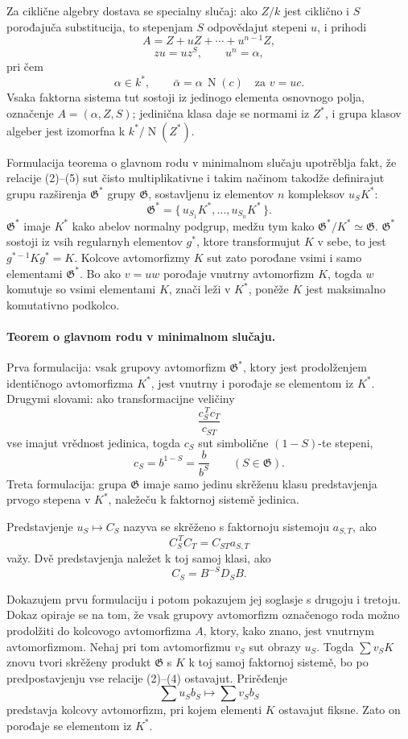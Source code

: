 \documentclass[11pt]{article}
\providecommand{\Norm}{\operatorname{N}}
\providecommand{\Gg}{\mathfrak G}
\begin{document}
Za ciklične algebry dostava se specialny slučaj: ako \(Z/k\) jest ciklično i \(S\) porođajuča substitucija, to stepenjam \(S\) odpovědajut stepeni \(u\), i prihodi
\[
        A=Z+uZ+\cdots+u^{n-1}Z,                              \tag{1'}
\]
\[
        zu=uz^S,\qquad u^n=\alpha,                            \tag{2'--3'}
\]
pri čem
\[
        \alpha\in k^*,\qquad
        \bar\alpha=\alpha\,\Norm(c)\quad\text{za }v=uc .       \tag{4'--5'}
\]
Vsaka faktorna sistema tut sostoji iz jedinogo elementa osnovnogo polja, označenje \(A=(\alpha,Z,S)\); jedinična klasa daje se normami iz \(Z^*\), i grupa klasov algeber jest izomorfna k \(k^*/\Norm(Z^*)\).

Formulacija teorema o glavnom rodu v minimalnom slučaju upotrěblja fakt, že relacije (2)--(5) sut čisto multiplikativne i takim načinom takodže definirajut grupu razširenja \(\Gg^*\) grupy \(\Gg\), sostavljenu iz elementov \(n\) kompleksov \(u_S K^*\):
\[
        \Gg^*=\{\,u_{S_1}K^*,\ldots,u_{S_n}K^*\,\}.            \tag{6}
\]
\(\Gg^*\) imaje \(K^*\) kako abelov normalny podgrup, medžu tym kako \(\Gg^*/K^*\simeq\Gg\). \(\Gg^*\) sostoji iz vsih regularnyh elementov \(g^*\), ktore transformujut \(K\) v sebe, to jest \(g^{*-1}Kg^*=K\). Kolcove avtomorfizmy \(K\) sut zato porođane vsimi i samo elementami \(\Gg^*\). Bo ako \(v=uw\) porođaje vnutrny avtomorfizm \(K\), togda \(w\) komutuje so vsimi elementami \(K\), znači leži v \(K^*\), poněže \(K\) jest maksimalno komutativno podkolco.

\paragraph{Teorem o glavnom rodu v minimalnom slučaju.}
Prva formulacija: vsak grupovy avtomorfizm \(\Gg^*\), ktory jest prodolženjem identičnogo avtomorfizma \(K^*\), jest vnutrny i porođaje se elementom iz \(K^*\). Drugymi slovami: ako transformacijne veličiny
\[
        \frac{c_S^{\,T}c_T}{c_{ST}}
\]
vse imajut vrědnost jedinica, togda \(c_S\) sut simbolične \((1-S)\)-te stepeni,
\[
        c_S=b^{1-S}=\frac{b}{b^S}\qquad(S\in\Gg).
\]
Treta formulacija: grupa \(\Gg\) imaje samo jedinu skrěženu klasu predstavjenja prvogo stepena v \(K^*\), naležeču k faktornoj sistemě jedinica.

Predstavjenje \(u_S\mapsto C_S\) nazyva se skrěženo s faktornoju sistemoju \(a_{S,T}\), ako
\[
        C_S^{\,T}C_T=C_{ST}a_{S,T}
\]
važy. Dvě predstavjenja naležet k toj samoj klasi, ako
\[
        C_S=B^{-S}D_SB .
\]

Dokazujem prvu formulaciju i potom pokazujem jej soglasje s drugoju i tretoju. Dokaz opiraje se na tom, že vsak grupovy avtomorfizm označenogo roda možno prodolžiti do kolcovogo avtomorfizma \(A\), ktory, kako znano, jest vnutrnym avtomorfizmom. Nehaj pri tom avtomorfizmu \(v_S\) sut obrazy \(u_S\). Togda \(\sum v_SK\) znovu tvori skrěženy produkt \(\Gg\) s \(K\) k toj samoj faktornoj sistemě, bo po predpostavjenju vse relacije (2)--(4) ostavajut. Prirěđenje
\[
        \sum u_Sb_S\longmapsto \sum v_Sb_S
\]
predstavja kolcovy avtomorfizm, pri kojem elementi \(K\) ostavajut fiksne. Zato on porođaje se elementom iz \(K^*\).
\end{document}
